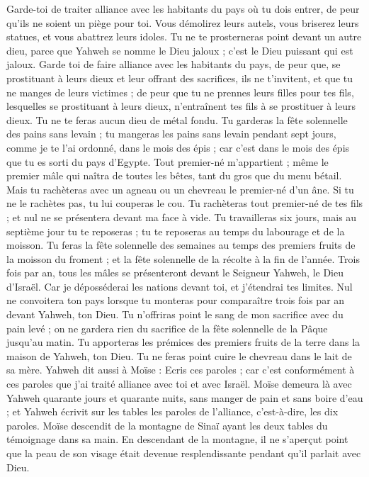 \begin{multicols}{2}
Garde-toi de traiter alliance avec les habitants du pays où tu dois entrer, de peur qu’ils ne soient un piège pour toi\FTNT{}.
Vous démolirez leurs autels, vous briserez leurs statues, et vous abattrez leurs idoles\FTNT{}.
Tu ne te prosterneras point devant un autre dieu, parce que Yahweh se nomme le Dieu jaloux ; c'est le Dieu puissant qui est jaloux.
Garde toi de faire alliance avec les habitants du pays, de peur que, se prostituant à leurs dieux et leur offrant des sacrifices, ils ne t’invitent, et que tu ne manges de leurs victimes ;
de peur que tu ne prennes leurs filles pour tes fils, lesquelles se prostituant à leurs dieux, n’entraînent tes fils à se prostituer à leurs dieux.
Tu ne te feras aucun dieu de métal fondu.
Tu garderas la fête solennelle des pains sans levain ; tu mangeras les pains sans levain pendant sept jours, comme je te l'ai ordonné, dans le mois des épis ; car c’est dans le mois des épis que tu es sorti du pays d'Egypte.
Tout premier-né m’appartient ; même le premier mâle qui naîtra de toutes les bêtes, tant du gros que du menu bétail.
Mais tu rachèteras avec un agneau ou un chevreau le premier-né d'un âne. Si tu ne le rachètes pas, tu lui couperas le cou. Tu rachèteras tout premier-né de tes fils ; et nul ne se présentera devant ma face à vide.
Tu travailleras six jours, mais au septième jour tu te reposeras ; tu te reposeras au temps du labourage et de la moisson.
Tu feras la fête solennelle des semaines au temps des premiers fruits de la moisson du froment ; et la fête solennelle de la récolte à la fin de l'année.
Trois fois par an, tous les mâles se présenteront devant le Seigneur Yahweh, le Dieu d'Israël.
Car je déposséderai les nations devant toi, et j'étendrai tes limites. Nul ne convoitera ton pays lorsque tu monteras pour comparaître trois fois par an devant Yahweh, ton Dieu.
Tu n'offriras point le sang de mon sacrifice avec du pain levé ; on ne gardera rien du sacrifice de la fête solennelle de la Pâque jusqu’au matin.
Tu apporteras les prémices des premiers fruits de la terre dans la maison de Yahweh, ton Dieu. Tu ne feras point cuire le chevreau dans le lait de sa mère.
Yahweh dit aussi à Moïse : Ecris ces paroles ; car c’est conformément à ces paroles que j'ai traité alliance avec toi et avec Israël.
Moïse demeura là avec Yahweh quarante jours et quarante nuits, sans manger de pain et sans boire d'eau ; et Yahweh écrivit sur les tables les paroles de l'alliance, c'est-à-dire, les dix paroles.
Moïse descendit de la montagne de Sinaï ayant les deux tables du témoignage dans sa main. En descendant de la montagne, il ne s'aperçut point que la peau de son visage était devenue resplendissante pendant qu'il parlait avec Dieu.

\end{multicols}
